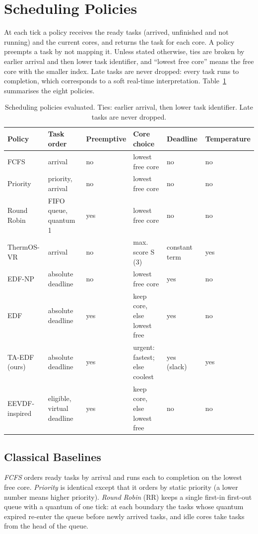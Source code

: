 \documentclass[conference]{IEEEtran}
\begin{document}
\section{Scheduling Policies}\label{sec:policies}
At each tick a policy receives the ready tasks (arrived, unfinished and not running) and the current cores, and returns the task for each core. A policy preempts a task by not mapping it. Unless stated otherwise, ties are broken by earlier arrival and then lower task identifier, and ``lowest free core'' means the free core with the smaller index. Late tasks are never dropped: every task runs to completion, which corresponds to a soft real-time interpretation. Table~\ref{tab:policies} summarises the eight policies.

\begin{table}[!t]
\centering
\scriptsize
\caption{Scheduling policies evaluated. Ties: earlier arrival, then lower task identifier. Late tasks are never dropped.}
\label{tab:policies}
\setlength{\tabcolsep}{3pt}
\begin{tabular}{llllll}
\toprule
Policy & Task order & Preemptive & Core choice & Deadline & Temperature \\
\midrule
FCFS & arrival & no & lowest free core & no & no \\
Priority & priority, arrival & no & lowest free core & no & no \\
Round Robin & FIFO queue, quantum 1 & yes & lowest free core & no & no \\
ThermOS-VR & arrival & no & max. score S (3) & constant term & yes \\
EDF-NP & absolute deadline & no & lowest free core & yes & no \\
EDF & absolute deadline & yes & keep core, else lowest free & yes & no \\
TA-EDF (ours) & absolute deadline & yes & urgent: fastest; else coolest & yes (slack) & yes \\
EEVDF-inspired & eligible, virtual deadline & yes & keep core, else lowest free & no & no \\
\bottomrule
\end{tabular}
\end{table}

\subsection{Classical Baselines}\label{sec:pol-classic}
\emph{FCFS} orders ready tasks by arrival and runs each to completion on the lowest free core. \emph{Priority} is identical except that it orders by static priority (a lower number means higher priority). \emph{Round Robin} (RR) keeps a single first-in first-out queue with a quantum of one tick: at each boundary the tasks whose quantum expired re-enter the queue before newly arrived tasks, and idle cores take tasks from the head of the queue.
\end{document}
